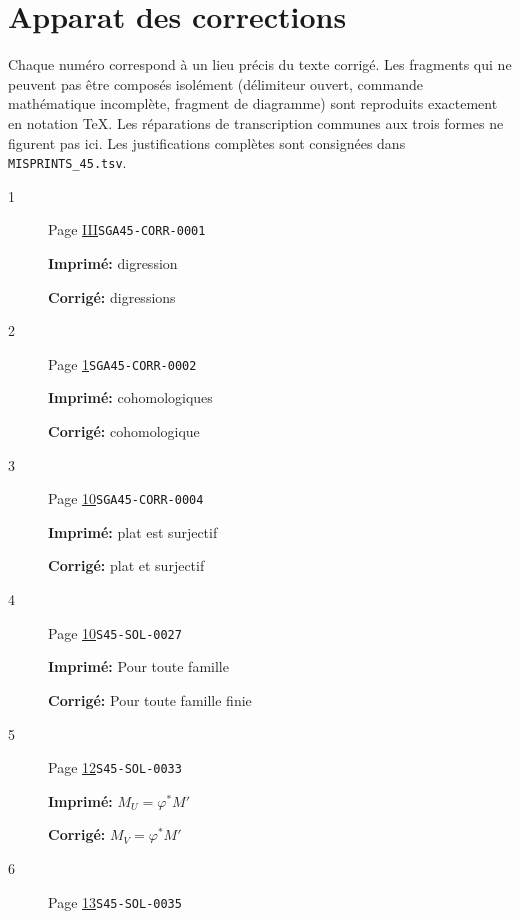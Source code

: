 \ifnum{}\relax
\clearpage
\chapter*{Apparat des corrections}
Chaque numéro correspond à un lieu précis du texte corrigé. Les fragments qui ne peuvent pas être composés isolément (délimiteur ouvert, commande mathématique incomplète, fragment de diagramme) sont reproduits exactement en notation TeX. Les réparations de transcription communes aux trois formes ne figurent pas ici. Les justifications complètes sont consignées dans \texttt{MISPRINTS\_45.tsv}.
\begingroup\small
\begin{description}
\item[\hypertarget{apparatus:FR-0001}{1}] Page \hyperlink{printpage:fr:III}{III}\quad\texttt{SGA45-CORR-0001}
\par\noindent\textbf{Imprimé:} digression
\par\noindent\textbf{Corrigé:} digressions
\smallskip
\item[\hypertarget{apparatus:FR-0002}{2}] Page \hyperlink{printpage:fr:1}{1}\quad\texttt{SGA45-CORR-0002}
\par\noindent\textbf{Imprimé:} cohomologiques
\par\noindent\textbf{Corrigé:} cohomologique
\smallskip
\item[\hypertarget{apparatus:FR-0003}{3}] Page \hyperlink{printpage:fr:10}{10}\quad\texttt{SGA45-CORR-0004}
\par\noindent\textbf{Imprimé:} plat est surjectif
\par\noindent\textbf{Corrigé:} plat et surjectif
\smallskip
\item[\hypertarget{apparatus:FR-0004}{4}] Page \hyperlink{printpage:fr:10}{10}\quad\texttt{S45-SOL-0027}
\par\noindent\textbf{Imprimé:} Pour toute famille
\par\noindent\textbf{Corrigé:} Pour toute famille finie
\smallskip
\item[\hypertarget{apparatus:FR-0005}{5}] Page \hyperlink{printpage:fr:12}{12}\quad\texttt{S45-SOL-0033}
\par\noindent\textbf{Imprimé:} \(M_U=\varphi^* M'\)
\par\noindent\textbf{Corrigé:} \(M_V=\varphi^* M'\)
\smallskip
\item[\hypertarget{apparatus:FR-0006}{6}] Page \hyperlink{printpage:fr:13}{13}\quad\texttt{S45-SOL-0035}

\end{description}
